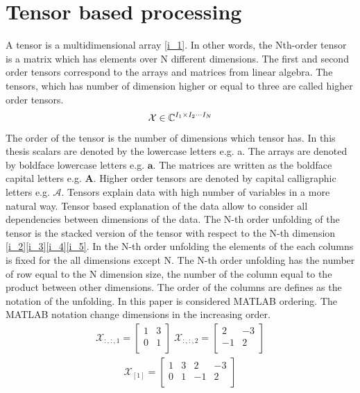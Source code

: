 \section{Tensor based processing}\label{sec:TBP}
A tensor is a multidimensional array \eqref{i_1}\cite{Book6}. In other words, the Nth-order tensor is a matrix which has elements over N different dimensions. The first and second order tensors correspond to the arrays and matrices from linear algebra\cite{Book12}. The tensors, which has number of dimension higher or equal to three are called higher order tensors. 
\begin{align}
\mathcal{X} \in \mathbb{C}^{I_1\times I_2\cdots I_N}
\label{i_1}
\end{align}
The order of the tensor is the number of dimensions which tensor has. In this thesis scalars are denoted by the lowercase letters e.g. a. The arrays are denoted by boldface lowercase letters e.g. $\mathbf{a}$. The matrices are written as the boldface capital letters e.g. $\mathbf{A}$. Higher order tensors are denoted by capital calligraphic letters e.g. $\mathcal{A}$.
Tensors explain data with high number of variables in a more natural way. Tensor based explanation of the data allow to consider all dependencies between dimensions of the data. 
The N-th order unfolding of the tensor is the stacked version of the tensor with respect to the N-th dimension \eqref{i_2}\eqref{i_3}\eqref{i_4}\eqref{i_5}\cite{Book16}. In the N-th order unfolding the elements of the each columns is fixed for the all dimensions except N. The N-th order unfolding has the number of row equal to the N dimension size, the number of the column equal to the product between other dimensions. The order of the columns are defines as the notation of the unfolding. In this paper is considered MATLAB ordering\cite{Book19}. The MATLAB notation change dimensions in the increasing order.
\begin{align}
\mathcal{X}_{:,:,1}=\begin{bmatrix}
1&3\\ 
0&1\\
\end{bmatrix} \; \mathcal{X}_{:,:,2}=\begin{bmatrix}
2&-3\\ 
-1&2\\
\end{bmatrix}
\label{i_2}
\end{align}
\begin{align}
\mathcal{X}_{[1]}=\begin{bmatrix}
1&3&2&-3\\ 
0&1&-1&2\\
\end{bmatrix}
\label{i_3}
\end{align}
